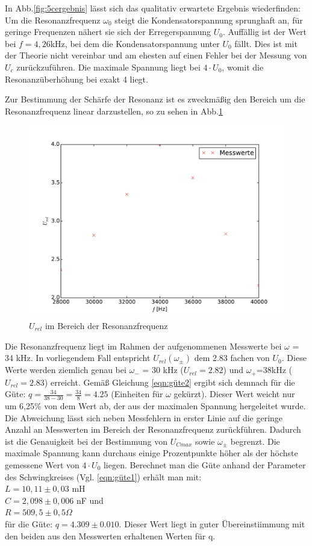 In Abb.\ref{fig:5cergebnis} lässt sich das qualitativ erwartete Ergebnis
wiederfinden: Um die Resonanzfrequenz $\omega_0$ steigt die Kondensatorspannung
sprunghaft an, für geringe Frequenzen nähert sie sich der Erregerspannung $U_0$.
Auffällig ist der Wert bei $f=4,26$kHz, bei dem die Kondensatorspannung unter
$U_0$ fällt. Dies ist mit der Theorie nicht vereinbar und am ehesten auf einen
Fehler bei der Messung von $U_c$ zurückzuführen. Die maximale Spannung liegt
bei $4\cdot U_0$, womit die Resonanzüberhöhung bei exakt 4 liegt.

Zur Bestimmung der Schärfe der Resonanz ist es zweckmäßig den Bereich um die
Resonanzfrequenz linear darzustellen, so zu sehen in Abb.\ref{fig:5clin}
\begin{figure}
  \centering
  \includegraphics[width=\textwidth]{5c2.pdf}
  \caption{$U_{rel}$ im Bereich der Resonanzfrequenz}
  \label{fig:5clin}
\end{figure}
Die Resonanzfrequenz liegt im Rahmen der aufgenommenen Messwerte bei
$\omega$ = 34 kHz.
In vorliegendem Fall entspricht $U_{rel}(\omega_{\pm})$ dem 2.83 fachen von $U_0$.
Diese Werte werden ziemlich genau bei $\omega_-$ = 30 kHz ($U_{rel}=2.82$) und
$\omega_+$=38kHz ($U_{rel} = 2.83$) erreicht. Gemäß Gleichung \ref{eqn:güte2} ergibt
sich demnach für die Güte:
$q = \frac{34}{38-30} = \frac{34}{8} = 4.25$ (Einheiten für $\omega$ gekürzt).
Dieser Wert weicht nur um 6,25\% von dem Wert ab, der aus der maximalen
Spannung hergeleitet wurde. Die Abweichung lässt sich neben Messfehlern in erster
Linie auf die geringe Anzahl an Messwerten im Bereich der Resonanzfrequenz
zurückführen. Dadurch ist die Genauigkeit bei der Bestimmung von
$U_{Cmax}$ sowie $\omega_\pm$ begrenzt. Die maximale Spannung kann durchaus
einige Prozentpunkte höher als der höchste gemessene Wert von $4\cdot U_0$
liegen.
Berechnet man die Güte anhand der Parameter des Schwingkreises
(Vgl. \ref{eqn:güte1}) erhält man mit: \\
$L = 10,11 \pm 0,03$ mH \\
$C = 2,098 \pm 0,006$ nF und \\
$R = 509,5 \pm 0,5 \Omega$\\
für die Güte:
$q = 4.309 \pm 0.010$.
Dieser Wert liegt in guter Übereinstiimmung mit den beiden aus den Messwerten
erhaltenen Werten für q.

